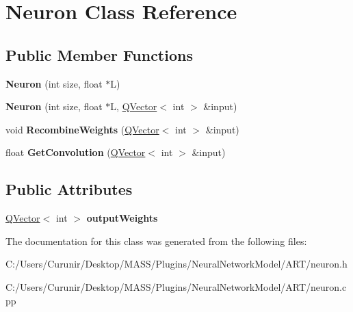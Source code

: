 \hypertarget{class_neuron}{}\section{Neuron Class Reference}
\label{class_neuron}
\subsection*{Public Member Functions}
\begin{DoxyCompactItemize}
\item 
\mbox{\label{class_neuron_a4da0f6ba396e848a67759d08b4aebb84}} 
{\bfseries Neuron} (int size, float $\ast$L)
\item 
\mbox{\label{class_neuron_a7306deecddc6f9d94c598d3a48f86c55}} 
{\bfseries Neuron} (int size, float $\ast$L, \hyperlink{class_q_vector}{Q\+Vector}$<$ int $>$ \&input)
\item 
\mbox{\label{class_neuron_a8fe0fb53c7a23bed3a843cd37037630b}} 
void {\bfseries Recombine\+Weights} (\hyperlink{class_q_vector}{Q\+Vector}$<$ int $>$ \&input)
\item 
\mbox{\label{class_neuron_a92a2a9bf900c645e29343f41962f158f}} 
float {\bfseries Get\+Convolution} (\hyperlink{class_q_vector}{Q\+Vector}$<$ int $>$ \&input)
\end{DoxyCompactItemize}
\subsection*{Public Attributes}
\begin{DoxyCompactItemize}
\item 
\mbox{\label{class_neuron_aadb0bf2fa55fe14651e9b1b904112400}} 
\hyperlink{class_q_vector}{Q\+Vector}$<$ int $>$ {\bfseries output\+Weights}
\end{DoxyCompactItemize}


The documentation for this class was generated from the following files\+:\begin{DoxyCompactItemize}
\item 
C\+:/\+Users/\+Curunir/\+Desktop/\+M\+A\+S\+S/\+Plugins/\+Neural\+Network\+Model/\+A\+R\+T/neuron.\+h\item 
C\+:/\+Users/\+Curunir/\+Desktop/\+M\+A\+S\+S/\+Plugins/\+Neural\+Network\+Model/\+A\+R\+T/neuron.\+cpp\end{DoxyCompactItemize}
